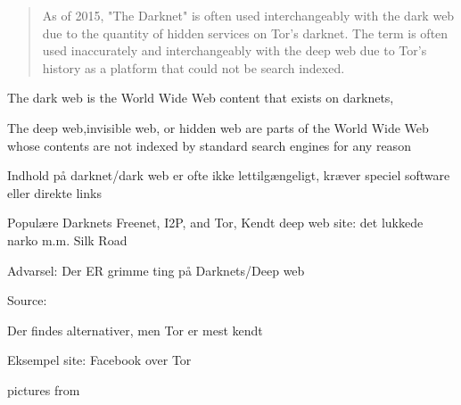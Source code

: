 \documentclass[20pt,landscape,a4paper]{foils}
\begin{document}

\begin{quote}
  As of 2015, "The Darknet" is often used interchangeably with the dark web due to the quantity of hidden services on Tor's darknet. The term is often used inaccurately and interchangeably with the deep web due to Tor's history as a platform that could not be search indexed.
\end{quote}

\begin{list2}
\item The dark web is the World Wide Web content that exists on darknets,
\item The deep web,invisible web, or hidden web are parts of the World Wide Web whose contents are not indexed by standard search engines for any reason
\item Indhold på darknet/dark web er ofte ikke lettilgængeligt, kræver speciel software eller direkte links
\item Populære Darknets Freenet, I2P, and Tor, Kendt deep web site: det lukkede narko m.m. Silk Road 
\end{list2}

\centerline{Advarsel: Der ER grimme ting på Darknets/Deep web}

Source: 




\centerline{}

\vskip 2cm
\centerline{Der findes alternativer, men Tor er mest kendt}



Eksempel site: Facebook over Tor\\ 





\centerline{pictures from }


\end{document}
